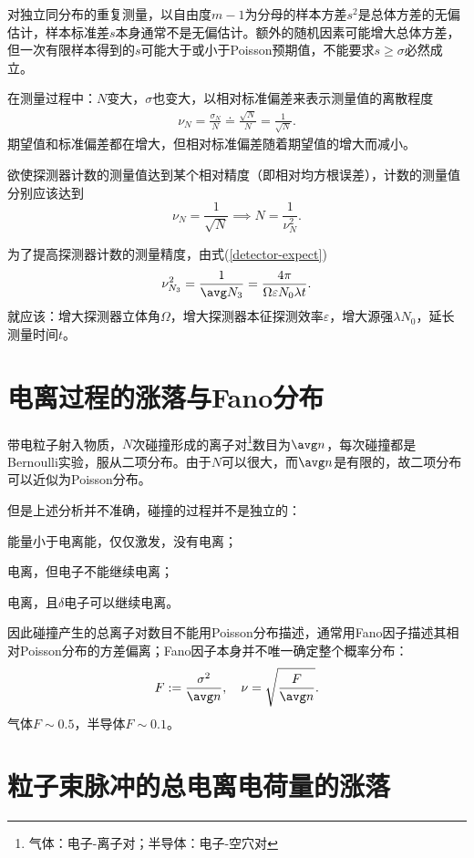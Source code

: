 对独立同分布的重复测量，以自由度$m-1$为分母的样本方差$s^2$是总体方差的无偏估计，样本标准差$s$本身通常不是无偏估计。额外的随机因素可能增大总体方差，但一次有限样本得到的$s$可能大于或小于Poisson预期值，不能要求$s\geq\sigma$必然成立。

在测量过程中：$N$变大，$\sigma$也变大，以相对标准偏差来表示测量值的离散程度
\begin{align}
	\nu_N=\frac{\sigma_N}N\doteq\frac{\sqrt N}N=\frac1{\sqrt N}.
\end{align}
期望值和标准偏差都在增大，但相对标准偏差随着期望值的增大而减小。

欲使探测器计数的测量值达到某个相对精度（即相对均方根误差），计数的测量值分别应该达到
\[
	\nu_N=\frac1{\sqrt N}\implies N=\frac1{\nu_N^2}.
\]

为了提高探测器计数的测量精度，由式(\ref{detector-expect})
\[
	\nu_{N_3}^2=\frac1{\avg N_3}=\frac{4\pi}{\Omega\varepsilon N_0\lambda t}.
\]
就应该：增大探测器立体角$\Omega$，增大探测器本征探测效率$\varepsilon$，增大源强$\lambda N_0$，延长测量时间$t$。

\section{电离过程的涨落与Fano分布}

带电粒子射入物质，$N$次碰撞形成的离子对\footnote{气体：电子-离子对；半导体：电子-空穴对}数目为$\avg n$，每次碰撞都是Bernoulli实验，服从二项分布。由于$N$可以很大，而$\avg n$是有限的，故二项分布可以近似为Poisson分布。

但是上述分析并不准确，碰撞的过程并不是独立的：
\begin{compactenum}
	\item 能量小于电离能，仅仅激发，没有电离；
	\item 电离，但电子不能继续电离；
	\item 电离，且$\delta$电子可以继续电离。
\end{compactenum}
因此碰撞产生的总离子对数目不能用Poisson分布描述，通常用Fano因子描述其相对Poisson分布的方差偏离；Fano因子本身并不唯一确定整个概率分布：
\begin{align}
	F:=\frac{\sigma^2}{\avg n},\quad\nu=\sqrt{\frac F{\avg n}}.
\end{align}
气体$F\sim 0.5$，半导体$F\sim 0.1$。

\section{粒子束脉冲的总电离电荷量的涨落}

